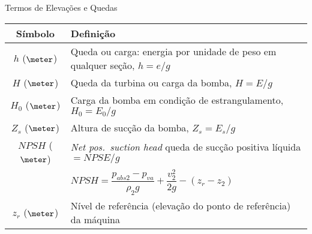     \begin{frame}{Termos de Elevações e Quedas}\vspace*{-1em}
        \setlength{\tabcolsep}{2mm}
        \noindent\begin{longtable}{cp{110mm}}
            \alert{Símbolo} & \alert{Definição} \\
            \hline
            $h$ ($\meter$) &
            Queda ou carga: energia por unidade de peso em qualquer seção, \alert{$h = e/g$} \\
            $H$ ($\meter$) &
            Queda da turbina ou carga da bomba, \alert{$H = E/g$} \\
            $H_0$ ($\meter$) &
            Carga da bomba em condição de estrangulamento, \alert{$H_0 = E_0/g$} \\
            $Z_s$ ($\meter$) &
            Altura de sucção da bomba, \alert{$Z_s = E_s/g$} \\
            $NPSH$ ($\meter$) &
            \textit{Net pos.~suction head\/} queda de sucção positiva líquida \alert{$= NPSE/g$} \\
            & \alert{$NPSH = \dfrac{p_{abs2} - p_{va}}{\rho_2g} + \dfrac{v_2^2}{2g} - (z_r -
            z_2)$} \\
            $z_r$ ($\meter$) &
            Nível de referência (elevação do ponto de referência) da máquina \\
            \hline
        \end{longtable}
    \end{frame}

